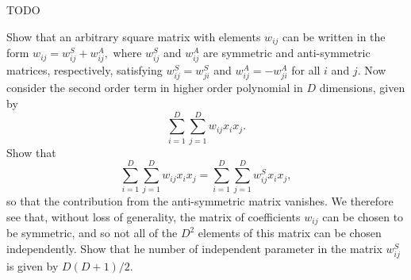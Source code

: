 TODO\\
\begin{cBoxA}{}
 Show that an arbitrary square matrix with elements $w_{ij}$ can
be written in the form $w_{ij}=w_{ij}^{S}+w_{ij}^{A},$ where $w_{ij}^{S}$
and $w_{ij}^{A}$ are symmetric and anti-symmetric matrices, respectively,
satisfying $w_{ij}^{S}=w_{ji}^{S}$ and $w_{ij}^{A}=-w_{ji}^{A}$
for all $i$ and $j$. Now consider the second order term in higher
order polynomial in $D$ dimensions, given by 
\[
\sum_{i=1}^{D}\sum_{j=1}^{D}w_{ij}x_{i}x_{j}.
\]
Show that 
\[
\sum_{i=1}^{D}\sum_{j=1}^{D}w_{ij}x_{i}x_{j}=\sum_{i=1}^{D}\sum_{j=1}^{D}w_{ij}^{S}x_{i}x_{j},
\]
so that the contribution from the anti-symmetric matrix vanishes.
We therefore see that, without loss of generality, the matrix of coefficients
$w_{ij}$ can be chosen to be symmetric, and so not all of the $D^{2}$
elements of this matrix can be chosen independently. Show that he
number of independent parameter in the matrix $w_{ij}^{S}$ is given
by $D(D+1)/2$. 
\end{cBoxA}


